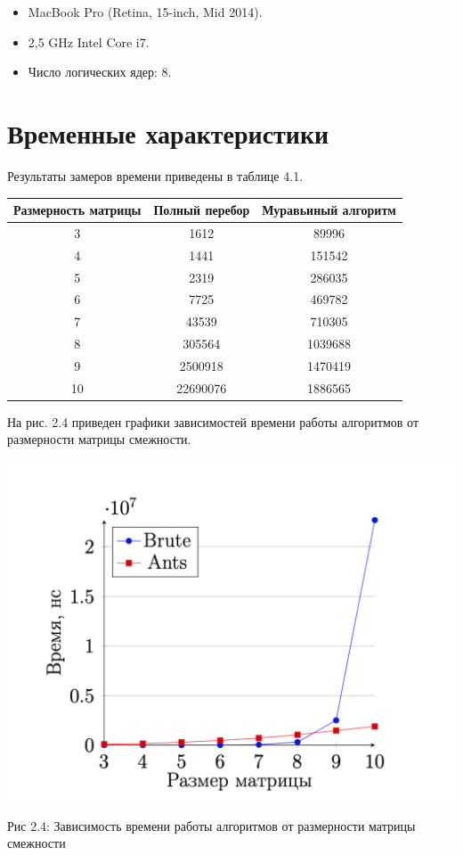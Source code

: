 \documentclass[12pt]{report}
\begin{document}
\begin{itemize}
	\item MacBook Pro (Retina, 15-inch, Mid 2014).
	\item 2,5 GHz Intel Core i7.
	\item Число логических ядер: 8.
\end{itemize}

\section{Временные характеристики} 

Результаты замеров времени приведены в таблице 4.1.

\begin{tabular}{|c c c|}
		\hline
		Размерность матрицы & Полный перебор & Муравьиный алгоритм  \\ [0.5ex] 
 		\hline\hline
		3 & 1612 & 89996\\
 		\hline
 		4 & 1441 & 151542\\
 		\hline
 		5 & 2319 & 286035\\
 		\hline
		6 & 7725 & 469782\\
		\hline
		7 & 43539 & 710305\\
		\hline
		8 & 305564 & 1039688\\
		\hline
		9 & 2500918 & 1470419\\
		\hline
		10 & 22690076 & 1886565\\
		\hline
\end{tabular}


На рис. 2.4 приведен графики зависимостей времени работы алгоритмов от размерности матрицы смежности.

\begin{center}
		\includegraphics[scale=0.4]{pics/time.png}
		
			Рис 2.4: Зависимость времени работы алгоритмов от размерности матрицы смежности
\end{center}
\end{document}
